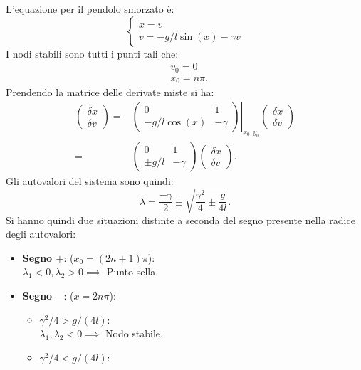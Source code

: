 \noindent
\begin{exmp}
    L'equazione per il pendolo smorzato è:
    \[
        \begin{cases}
            \dot{x} = v\\
	    \dot{v} = - g /l\sin (x) - \gamma v
        \end{cases}
    \] 
    I nodi stabili sono tutti i punti tali che:
    \[\begin{aligned}
	& v_0 = 0\\
	& x_0 = n \pi
    .\end{aligned}\]
    Prendendo la matrice delle derivate miste si ha:
    \[\begin{aligned}
	\begin{pmatrix} \delta\dot{x} \\ \delta  \dot{v} \end{pmatrix} =&
	\left.	\begin{pmatrix} 
	    0 & 1 \\
	    -g /l \cos (x) & - \gamma
	\end{pmatrix} \right|_{x_0,y_0}
	\begin{pmatrix} \delta x \\ \delta v \end{pmatrix} \\
	=&
	\begin{pmatrix} 
	    0 & 1 \\
	    \pm g /l& - \gamma
	\end{pmatrix}
	\begin{pmatrix} \delta x \\ \delta v \end{pmatrix} 
    .\end{aligned}\]
    Gli autovalori del sistema sono quindi:
    \[
        \lambda  = \frac{-\gamma}{2}\pm \sqrt{\frac{\gamma^2}{4} \pm \frac{g}{4l}} 
    .\] 
    Si hanno quindi due situazioni distinte a seconda del segno presente nella radice degli autovalori:
    \begin{itemize}
	\item \textbf{Segno $+$}: ($x_0 = (2n+1)\pi$):\\
	    $\lambda_1 < 0,  \lambda_2 > 0 \implies$ Punto sella.
	\item \textbf{Segno $-$}: ($x = 2n\pi$): 
	    \begin{itemize}
		\item $\gamma^2 / 4 > g /(4l)$: \\
		    $\lambda_1,\lambda_2 < 0 \implies$ Nodo stabile.
		\item $\gamma^2 / 4 < g /(4l)$: \\

\end{itemize}
\end{itemize}
\end{exmp}
